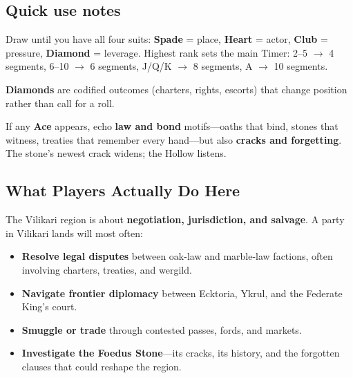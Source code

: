 \newcommand{\card}[4]{%
  \par\smallskip%
  \noindent\textbf{#1. #2}\hfill\textsc{\small #3}%
  \par%
  \noindent\textit{#4}%
  \par\smallskip%
}

\subsection*{Quick use notes}
Draw until you have all four suits: \textbf{Spade} = place, \textbf{Heart} = actor, \textbf{Club} = pressure, \textbf{Diamond} = leverage. Highest rank sets the main Timer: 2--5 $\rightarrow$ 4 segments, 6--10 $\rightarrow$ 6 segments, J/Q/K $\rightarrow$ 8 segments, A $\rightarrow$ 10 segments.

\textbf{Diamonds} are codified outcomes (charters, rights, escorts) that change position rather than call for a roll.

If any \textbf{Ace} appears, echo \textbf{law and bond} motifs---oaths that bind, stones that witness, treaties that remember every hand---but also \textbf{cracks and forgetting}. The stone's newest crack widens; the Hollow listens.

\subsection*{What Players Actually Do Here}
\label{sec:vilikari-player-hooks}

The Vilikari region is about \textbf{negotiation, jurisdiction, and salvage}. A party in Vilikari lands will most often:

\begin{itemize}
  \item \textbf{Resolve legal disputes} between oak-law and marble-law factions, often involving charters, treaties, and wergild.
  \item \textbf{Navigate frontier diplomacy} between Ecktoria, Ykrul, and the Federate King's court.
  \item \textbf{Smuggle or trade} through contested passes, fords, and markets.
  \item \textbf{Investigate the Foedus Stone}---its cracks, its history, and the forgotten clauses that could reshape the region.
\end{itemize}

